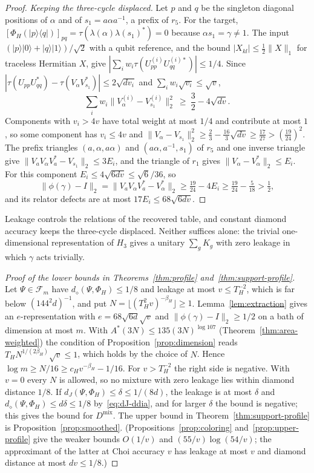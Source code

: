 \documentclass[11pt,a4paper]{article}
\theoremstyle{plain}
\theoremstyle{definition}
\theoremstyle{remark}
\newcommand{\Dmix}{D^{\mathrm{mix}}}
\newcommand{\dJ}{d_J}
\newcommand{\ddia}{d_\diamond}
\begin{document}
\begin{proof}
\emph{Keeping the three-cycle displaced.} Let $p$ and $q$ be the singleton diagonal positions of $\alpha$ and of
$s_1=a\alpha a^{-1}$, a prefix of $r_5$. For the target, $[\Phi_H(|p\rangle\langle q|)]_{pq}=\tau(\lambda(\alpha)\lambda(s_1)^*)=0$
because $\alpha s_1=\gamma\ne1$. The input $(|p\rangle|0\rangle+|q\rangle|1\rangle)/\sqrt2$ with a qubit reference, and the bound
$|X_{kl}|\le\frac12\|X\|_1$ for traceless Hermitian $X$, give $|\sum_iw_i\tau(U^{(i)}_{pp}U^{(i)*}_{qq})|\le1/4$. Since
$|\tau(U_{pp}U_{qq}^*)-\tau(V_\alpha V_{s_1}^*)|\le2\sqrt{dv_i}$ and $\sum_iw_i\sqrt{v_i}\le\sqrt v$,
\[
\sum_iw_i\|V^{(i)}_\alpha-V^{(i)}_{s_1}\|_2^2\ \ge\ \frac32-4\sqrt{dv}.
\]
Components with $v_i>4v$ have total weight at most $1/4$ and contribute at most $1$, so some component has $v_i\le4v$ and
$\|V_\alpha-V_{s_1}\|_2^2\ge\frac23-\frac{16}3\sqrt{dv}\ge\frac{17}{27}>(\frac{19}{24})^2$. The prefix triangles $(a,\alpha,a\alpha)$ and
$(a\alpha,a^{-1},s_1)$ of $r_5$ and one inverse triangle give $\|V_aV_\alpha V_a^*-V_{s_1}\|_2\le3E_i$, and the triangle of $r_1$ gives
$\|V_\alpha-V_\alpha^*\|_2\le E_i$. For this component $E_i\le4\sqrt{6dv}\le\sqrt6/36$, so
\[
\|\phi(\gamma)-I\|_2=\|V_aV_\alpha V_a^*-V_\alpha^*\|_2\ge\tfrac{19}{24}-4E_i\ge\tfrac{19}{24}-\tfrac5{18}>\tfrac12,
\]
and its relator defects are at most $17E_i\le68\sqrt{6dv}$.
\end{proof}

Leakage controls the relations of the recovered table, and constant diamond accuracy keeps the three-cycle displaced.
Neither suffices alone: the trivial one-dimensional representation of $H_3$ gives a unitary $\sum_gK_g$ with zero leakage in
which $\gamma$ acts trivially.

\begin{proof}[Proof of the lower bounds in Theorems~\ref{thm:profile} and~\ref{thm:support-profile}]
Let $\Psi\in\mathcal F_m$ have $\ddia(\Psi,\Phi_H)\le1/8$ and leakage at most $v\le T_H^{-2}$, which is far below $(144^2d)^{-1}$, and put
$N=\lfloor(T_H^2v)^{-\beta_H}\rfloor\ge1$. Lemma~\ref{lem:extraction} gives an $e$-representation with $e=68\sqrt{6d}\sqrt v$ and
$\|\phi(\gamma)-I\|_2\ge1/2$ on a bath of dimension at most $m$. With $A^*(3N)\le135(3N)^{\log107}$ (Theorem~\ref{thm:area-weighted}) the
condition of Proposition~\ref{prop:dimension} reads $T_HN^{1/(2\beta_H)}\sqrt v\le1$, which holds by the choice of $N$. Hence
$\log m\ge N/16\ge c_Hv^{-\beta_H}-1/16$. For $v>T_H^{-2}$ the right side is negative. With $v=0$ every $N$ is allowed, so no mixture
with zero leakage lies within diamond distance $1/8$. If $\dJ(\Psi,\Phi_H)\le\delta\le1/(8d)$, the leakage is at most $\delta$ and
$\ddia(\Psi,\Phi_H)\le d\delta\le1/8$ by~\eqref{eq:dJ-ddia}, and for larger $\delta$ the bound is negative; this gives the bound for
$\Dmix$. The upper bound in Theorem~\ref{thm:support-profile} is Proposition~\ref{prop:smoothed}. (Propositions~\ref{prop:coloring}
and~\ref{prop:upper-profile} give the weaker bounds $O(1/v)$ and $(55/v)\log(54/v)$; the approximant of the latter at Choi accuracy $v$ has
leakage at most $v$ and diamond distance at most $dv\le1/8$.)
\end{proof}
\end{document}
